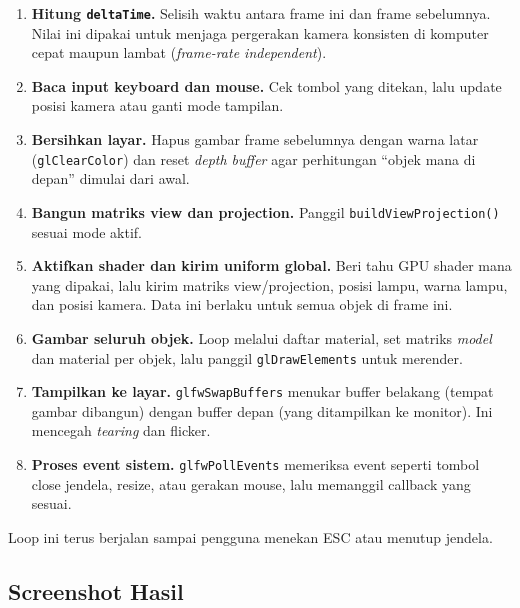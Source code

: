 \documentclass[12pt,a4paper]{article}
\begin{document}
\begin{enumerate}
    \item \textbf{Hitung \texttt{deltaTime}.} Selisih waktu antara frame ini dan frame sebelumnya. Nilai ini dipakai untuk menjaga pergerakan kamera konsisten di komputer cepat maupun lambat (\textit{frame-rate independent}).

    \item \textbf{Baca input keyboard dan mouse.} Cek tombol yang ditekan, lalu update posisi kamera atau ganti mode tampilan.

    \item \textbf{Bersihkan layar.} Hapus gambar frame sebelumnya dengan warna latar (\texttt{glClearColor}) dan reset \textit{depth buffer} agar perhitungan ``objek mana di depan'' dimulai dari awal.

    \item \textbf{Bangun matriks view dan projection.} Panggil \texttt{buildViewProjection()} sesuai mode aktif.

    \item \textbf{Aktifkan shader dan kirim uniform global.} Beri tahu GPU shader mana yang dipakai, lalu kirim matriks view/projection, posisi lampu, warna lampu, dan posisi kamera. Data ini berlaku untuk semua objek di frame ini.

    \item \textbf{Gambar seluruh objek.} Loop melalui daftar material, set matriks \textit{model} dan material per objek, lalu panggil \texttt{glDrawElements} untuk merender.

    \item \textbf{Tampilkan ke layar.} \texttt{glfwSwapBuffers} menukar buffer belakang (tempat gambar dibangun) dengan buffer depan (yang ditampilkan ke monitor). Ini mencegah \textit{tearing} dan flicker.

    \item \textbf{Proses event sistem.} \texttt{glfwPollEvents} memeriksa event seperti tombol close jendela, resize, atau gerakan mouse, lalu memanggil callback yang sesuai.
\end{enumerate}

Loop ini terus berjalan sampai pengguna menekan ESC atau menutup jendela.

\subsection{Screenshot Hasil}
\end{document}
